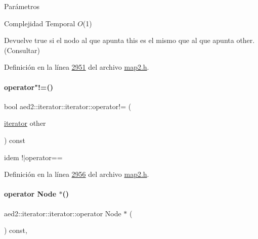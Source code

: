 \begin{DoxyParams}{\-Parámetros}
\begin{DoxyDescription}
\item[Complejidad Temporal]$O$(1)
\end{DoxyDescription}

Devuelve true si el nodo al que apunta this es el mismo que al que apunta other. (Consultar) 

Definición en la línea \hyperlink{map2_8h_source_l02951}{2951} del archivo \hyperlink{map2_8h_source}{map2.\+h}.

\mbox{\label{classaed2_1_1iterator_1_1iterator_a1c42a3d770db85a6b25abf05e7fa1683_a1c42a3d770db85a6b25abf05e7fa1683}} 
\paragraph{\texorpdfstring{operator"!=()}{operator!=()}}
{\footnotesize\ttfamily bool aed2\+::iterator\+::iterator\+::operator!= (\begin{DoxyParamCaption}\item[{\hyperlink{classaed2_1_1iterator_1_1iterator}{iterator}}]{other }\end{DoxyParamCaption}) const\hspace{0.3cm}{\ttfamily [inline]}}



idem !$\vert$operator== 



Definición en la línea \hyperlink{map2_8h_source_l02956}{2956} del archivo \hyperlink{map2_8h_source}{map2.\+h}.

\mbox{\label{classaed2_1_1iterator_1_1iterator_af9084d95ac1d97029bb9a303abe9b862_af9084d95ac1d97029bb9a303abe9b862}} 
\paragraph{\texorpdfstring{operator Node $\ast$()}{operator Node *()}}
{\footnotesize\ttfamily aed2\+::iterator\+::iterator\+::operator Node $\ast$ (\begin{DoxyParamCaption}{ }\end{DoxyParamCaption}) const\hspace{0.3cm}{\ttfamily [inline]}, {\ttfamily [private]}}




\end{DoxyParams}
